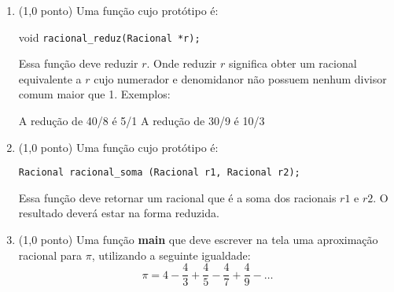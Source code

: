 \documentclass[12pt,a4paper]{article}
\begin{document}
\begin{enumerate}[label=\alph*)]
\item (1,0 ponto) Uma função cujo protótipo é:

void \texttt{racional\_reduz(Racional *r);}

Essa função deve reduzir $r$. Onde reduzir $r$ significa obter um racional equivalente a $r$ cujo numerador e denomidanor não possuem nenhum divisor comum maior que 1. Exemplos:

A redução de 40/8 é 5/1
A redução de 30/9 é 10/3

\item (1,0 ponto) Uma função cujo protótipo é:

\texttt{Racional racional\_soma (Racional r1, Racional r2);}

Essa função deve retornar um racional que é a soma dos racionais $r1$ e $r2$. O resultado deverá estar na forma reduzida.

\item (1,0 ponto) Uma função \textbf{main} que deve escrever na tela uma aproximação racional para $\pi$, utilizando a seguinte igualdade: $$\pi = 4 - \dfrac{4}{3} + \dfrac{4}{5} - \dfrac{4}{7} + \dfrac{4}{9} - \dots$$
\end{enumerate}
\end{document}
